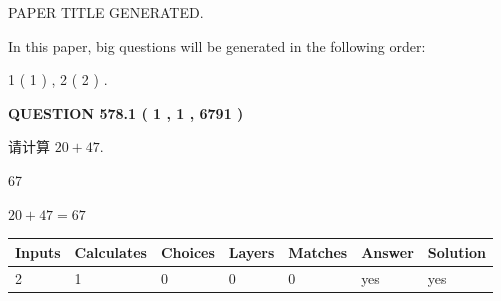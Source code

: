 \documentclass{ctexart}
\begin{document}
   
 \vspace{0.2in}
 
 
 
 
   
   
 PAPER TITLE GENERATED.
   
   
   
\vspace{0.2in}
   
In this paper, big questions will be generated in the following order: 
   
   
   1 ( 1 )
 ,
   2 ( 2 )
 .
  
\vspace{0.2in}
  
{\textbf{\Large{QUESTION
578.1 
 ( 1 , 1 , 6791 )
}}}
  
  
 
请计算 $ %
20 +  %
47 $.
 
 
 
\noindent{}
 
 

67
 
 
\noindent{}
 
 

 
 
 
\noindent{}
 
 

$ %
20 +  %
47=   %
67$
 
 
\noindent{}
 
 

 
   
   
   
   
\noindent\begin{tabular}{|l|l|l|l|l|l|l|}
 \hline
Inputs & Calculates & Choices & Layers & Matches & Answer & Solution \\ \hline
 2  & 
 1  & 
 0
  & 
 0  & 
 0  & 
  yes & 
  yes 
  \\ \hline
 \end{tabular}
   
   
   
   
\noindent{}
   
   
  
\end{document}
